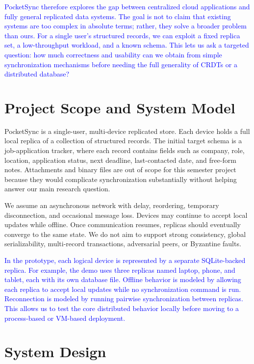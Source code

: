 \documentclass[10pt,twocolumn]{article}
\newcommand{\update}[1]{\textcolor{blue}{#1}}
\begin{document}
\update{PocketSync therefore explores the gap between centralized cloud applications and fully general replicated data systems. The goal is not to claim that existing systems are too complex in absolute terms; rather, they solve a broader problem than ours. For a single user's structured records, we can exploit a fixed replica set, a low-throughput workload, and a known schema. This lets us ask a targeted question: how much correctness and usability can we obtain from simple synchronization mechanisms before needing the full generality of CRDTs or a distributed database?}

\section{Project Scope and System Model}

PocketSync is a single-user, multi-device replicated store. Each device holds a full local replica of a collection of structured records. The initial target schema is a job-application tracker, where each record contains fields such as company, role, location, application status, next deadline, last-contacted date, and free-form notes. Attachments and binary files are out of scope for this semester project because they would complicate synchronization substantially without helping answer our main research question.

We assume an asynchronous network with delay, reordering, temporary disconnection, and occasional message loss. Devices may continue to accept local updates while offline. Once communication resumes, replicas should eventually converge to the same state. We do not aim to support strong consistency, global serializability, multi-record transactions, adversarial peers, or Byzantine faults.

\update{In the prototype, each logical device is represented by a separate SQLite-backed replica. For example, the demo uses three replicas named laptop, phone, and tablet, each with its own database file. Offline behavior is modeled by allowing each replica to accept local updates while no synchronization command is run. Reconnection is modeled by running pairwise synchronization between replicas. This allows us to test the core distributed behavior locally before moving to a process-based or VM-based deployment.}

\section{System Design}
\end{document}
